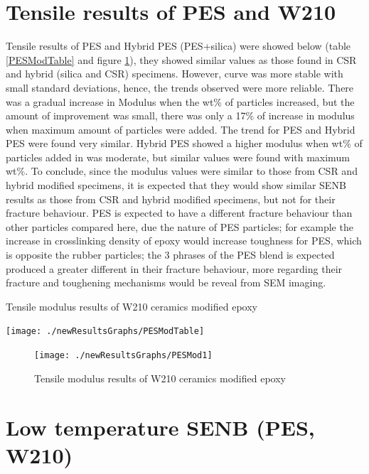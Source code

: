 \documentclass[numbers=noendperiod,chapterprefix=on]{icldt} %
\begin{document}
{\section{Tensile results of PES and W210}
Tensile results of PES and Hybrid PES (PES+silica) were showed below (table \ref{PESModTable} and figure \ref{PESMod1}), they showed similar values as those found in CSR and hybrid (silica and CSR) specimens. However, curve was more stable with small standard deviations, hence, the trends observed were more reliable. There was a gradual increase in Modulus when the wt\% of particles increased, but the amount of improvement was small, there was only a 17\% of increase in modulus when maximum amount of particles were added. The trend for PES and Hybrid PES were found very similar. Hybrid PES showed a higher modulus when wt\% of particles added in was moderate, but similar values were found with maximum wt\%. To conclude, since the modulus values were similar to those from CSR and hybrid modified specimens, it is expected that they would show similar SENB results as those from CSR and hybrid modified specimens, but not for their fracture behaviour. PES is expected to have a different fracture behaviour than other particles compared here, due the nature of PES particles; for example the increase in crosslinking density of epoxy would increase toughness for PES, which is opposite the rubber particles; the 3 phrases of the PES blend is expected produced a greater different in their fracture behaviour, more regarding their fracture and toughening mechanisms would be reveal from SEM imaging.

\begin{table}[!htpb]
\centering
\caption{Tensile modulus results of W210 ceramics modified epoxy} \label{PESModTable}
\texttt{[image: ./newResultsGraphs/PESModTable]}
\end{table}
\FloatBarrier

\begin{figure}[!hp]
\centering
\texttt{[image: ./newResultsGraphs/PESMod1]}
\caption{Tensile modulus results of W210 ceramics modified epoxy}\label{PESMod1}
\end{figure}
\FloatBarrier

\section{Low temperature SENB (PES, W210)}

}
\end{document}
